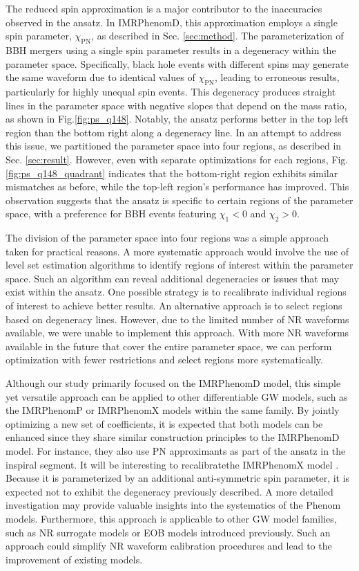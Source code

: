 \documentclass[twocolumn]{aastex631}
\begin{document}
The reduced spin approximation is a major contributor to the inaccuracies
observed in the ansatz. In IMRPhenomD, this approximation employs a single spin
parameter, $\chi_{\mathrm{PN}}$, as described in Sec. \ref{sec:method}. The
parameterization of BBH mergers using a single spin parameter results in a
degeneracy within the parameter space. Specifically, black hole events with
different spins may generate the same waveform due to identical values of
$\chi_{\mathrm{PN}}$, leading to erroneous results, particularly for highly
unequal spin events. This degeneracy produces straight lines in the parameter
space with negative slopes that depend on the mass ratio, as shown in
Fig.\ref{fig:ps_q148}. Notably, the ansatz performs better in the top left
region than the bottom right along a degeneracy line. In an attempt to address
this issue, we partitioned the parameter space into four regions, as described
in Sec. \ref{sec:result}. However, even with separate optimizations for each
regions, Fig.\ref{fig:ps_q148_quadrant} indicates that the bottom-right region
exhibits similar mismatches as before, while the top-left region's performance
has improved. This observation suggests that the ansatz is specific to certain
regions of the parameter space, with a preference for BBH events featuring
$\chi_1<0$ and $\chi_2>0$.


The division of the parameter space into four regions was a simple approach
taken for practical reasons. A more systematic approach would involve the use of
level set estimation algorithms to identify regions of interest within the
parameter space. Such an algorithm can reveal additional degeneracies or issues
that may exist within the ansatz. One possible strategy is to recalibrate
individual regions of interest to achieve better results. An alternative
approach is to select regions based on degeneracy lines. However, due to the
limited number of NR waveforms available, we were unable to implement this
approach. With more NR waveforms available in the future that cover the entire
parameter space, we can perform optimization with fewer restrictions and select
regions more systematically.

Although our study primarily focused on the IMRPhenomD model, this simple yet
versatile approach can be applied to other differentiable GW models, such as the
IMRPhenomP \citep{hannam2014simple} or IMRPhenomX \citep{pratten2020setting} 
models within the same family. By jointly optimizing a new set of coefficients,
it is expected that both models can be enhanced since they share similar
construction principles to the IMRPhenomD model. For instance, they also use PN
approximants as part of the ansatz in the inspiral segment. It will be interesting 
to recalibratethe IMRPhenomX model \citep{pratten2020setting}. Because it is
parameterized by an additional anti-symmetric spin parameter, it is expected not
to exhibit the degeneracy previously described. A more detailed investigation
may provide valuable insights into the systematics of the Phenom models.
Furthermore, this approach is applicable to other GW model families, such as NR
surrogate models or EOB models introduced previously. Such an approach could 
simplify NR waveform calibration procedures and lead to the improvement of 
existing models.
\end{document}
